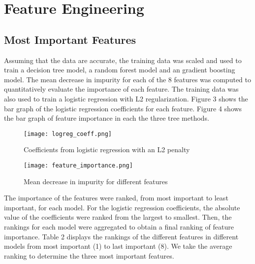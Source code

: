 \documentclass[11pt,letterpaper]{article}
\begin{document}
\section{Feature Engineering}
\subsection{Most Important Features}
Assuming that the data are accurate, the training data was scaled and used to train a decision tree model, a random forest model and an gradient boosting model. The mean decrease in impurity for each of the 8 features was computed to quantitatively evaluate the importance of each feature. The training data was also used to train a logistic regression with L2 regularization. Figure 3 shows the bar graph of the logistic regression coefficients for each feature. Figure 4 shows the bar graph of feature importance in each the three tree methods. 

\begin{figure}[H]
    \centering
    \texttt{[image: logreg\_coeff.png]}
    \caption{Coefficients from logistic regression with an L2 penalty}
    \label{fig:enter-label}
\end{figure}

\begin{figure}[H]
    \centering
    \texttt{[image: feature\_importance.png]}
    \caption{Mean decrease in impurity for different features}
    \label{fig:enter-label}
\end{figure}

The importance of the features were ranked, from most important to least important, for each model. For the logistic regression coefficients, the absolute value of the coefficients were ranked from the largest to smallest. Then, the rankings for each model were aggregated to obtain a final ranking of feature importance. Table 2 displays the rankings of the different features in different models from most important (1) to last important (8). We take the average ranking to determine the three most important features. 
\end{document}
